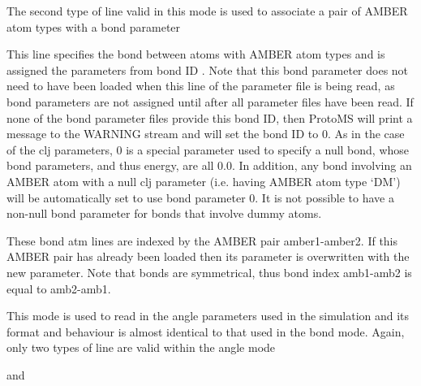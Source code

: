 \documentclass[letterpaper,10pt,english]{sphinxmanual}
\begin{document}
The second type of line valid in this mode is used to associate a pair of AMBER atom types with a bond parameter

%
\begin{sphinxVerbatim}[commandchars=\\\{\}]
   
\end{sphinxVerbatim}

This line specifies the bond between atoms with AMBER atom types  and  is assigned the parameters from bond ID . Note that this bond parameter does not need to have been loaded when this line of the parameter file is being read, as bond parameters are not assigned until after all parameter files have been read. If none of the bond parameter files provide this bond ID, then ProtoMS will print a message to the WARNING stream and will set the bond ID to 0. As in the case of the clj parameters, 0 is a special parameter used to specify a null bond, whose bond parameters, and thus energy, are all 0.0. In addition, any bond involving an AMBER atom with a null clj parameter (i.e. having AMBER atom type ‘DM’) will be automatically set to use bond parameter 0. It is not possible to have a non-null bond parameter for bonds that involve dummy atoms.

These bond atm lines are indexed by the AMBER pair amber1-amber2. If this AMBER pair has already been loaded then its parameter is overwritten with the new parameter. Note that bonds are symmetrical, thus bond index amb1-amb2 is equal to amb2-amb1.

\ignorespaces 
{}

This mode is used to read in the angle parameters used in the simulation and its format and behaviour is almost identical to that used in the bond mode. Again, only two types of line are valid within the angle mode

%
\begin{sphinxVerbatim}[commandchars=\\\{\}]
   
\end{sphinxVerbatim}

and

%
\begin{sphinxVerbatim}[commandchars=\\\{\}]
    
\end{sphinxVerbatim}
\end{document}
